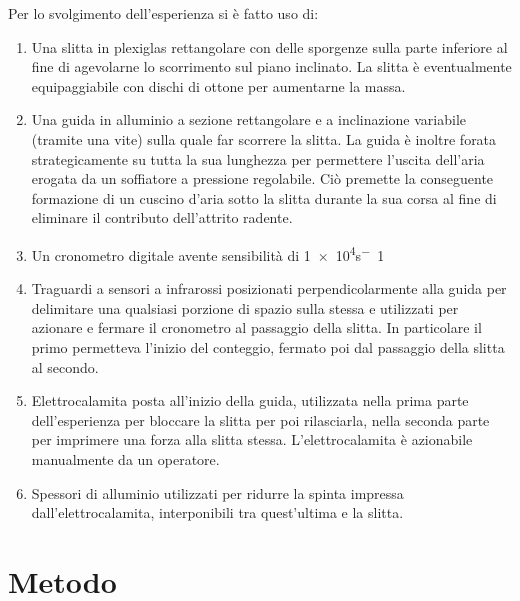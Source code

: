 \documentclass[a4paper,11pt,oneside]{article}
\begin{document}
Per lo svolgimento dell'esperienza si è fatto uso di:
\begin{enumerate}
    \item Una slitta in plexiglas rettangolare con delle sporgenze sulla parte inferiore al fine di agevolarne lo scorrimento sul piano inclinato. La slitta è eventualmente equipaggiabile con dischi di ottone per aumentarne la massa.
    \item Una guida in alluminio a sezione rettangolare e a inclinazione variabile (tramite una vite) sulla quale far scorrere la slitta. La guida è inoltre forata strategicamente su tutta la sua lunghezza per permettere l'uscita dell'aria erogata da un soffiatore a pressione regolabile. Ciò premette la conseguente formazione di un cuscino d'aria sotto la slitta durante la sua corsa al fine di eliminare il contributo dell'attrito radente.
    \item Un cronometro digitale avente sensibilità di \num{1e4}\si{s^-1}
    \item Traguardi a sensori a infrarossi posizionati perpendicolarmente alla guida per delimitare una qualsiasi porzione di spazio sulla stessa e utilizzati per azionare e fermare il cronometro al passaggio della slitta. In particolare il primo permetteva l'inizio del conteggio, fermato poi dal passaggio della slitta al secondo.
    \item Elettrocalamita posta all'inizio della guida, utilizzata nella prima parte dell'esperienza per bloccare la slitta per poi rilasciarla, nella seconda parte  per imprimere una forza  alla slitta stessa. L'elettrocalamita è azionabile manualmente da un operatore.
    \item Spessori di alluminio utilizzati per ridurre la spinta impressa dall'elettrocalamita, interponibili tra quest'ultima e la slitta.
\end{enumerate}
    

\section{Metodo}
\end{document}
